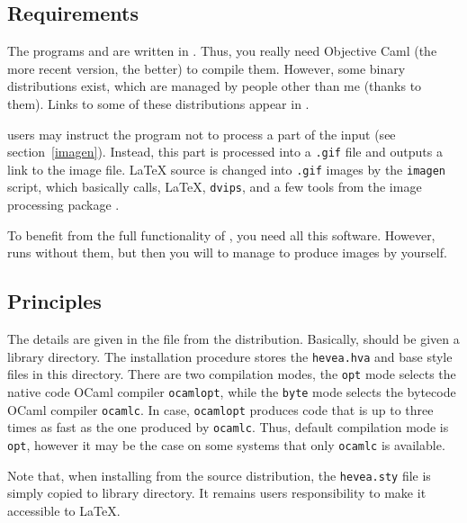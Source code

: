 \subsection{Requirements}\label{requirements}
The programs  and  are written in
. Thus, you
really need Objective Caml (the more recent version, the better) to
compile them.
However, some binary distributions exist, which are managed by
people other than me (thanks to them).
Links to some of these distributions appear in .

\label{imagen:needs}\hevea{} users may instruct the program not to process a
part of the input (see section~\ref{imagen}). Instead, this part is
processed into a 
\verb+.gif+ file and \hevea{} outputs a  link to the image file.
\LaTeX{} source is changed into \verb+.gif+ images by the \verb+imagen+
script, which basically calls, \LaTeX, \texttt{dvips},
and a few tools from the image processing package
.

To benefit from the full functionality of \hevea, you need all
this software. However, \hevea{} runs without them, but then you will
to manage to produce images by yourself.

\subsection{Principles}
The details are given in the 
file from the distribution.
Basically, \hevea{} should be given a library
directory. The installation procedure stores the \texttt{hevea.hva}
and base style files in this directory.
There are two compilation modes, the \texttt{opt} mode selects the
native code  OCaml compiler \texttt{ocamlopt}, while the \texttt{byte}
mode selects the bytecode  OCaml compiler \texttt{ocamlc}.
In \hevea{} case, \texttt{ocamlopt} produces code that is up to three
times as fast as the one produced by \texttt{ocamlc}.
Thus, default compilation mode is \texttt{opt}, however it may be the
case on some systems that only \texttt{ocamlc} is available.

Note that, when installing \hevea{} from the source distribution, the
\texttt{hevea.sty} file is simply copied to \hevea{}
library directory. It remains users responsibility to
make it accessible to \LaTeX.

